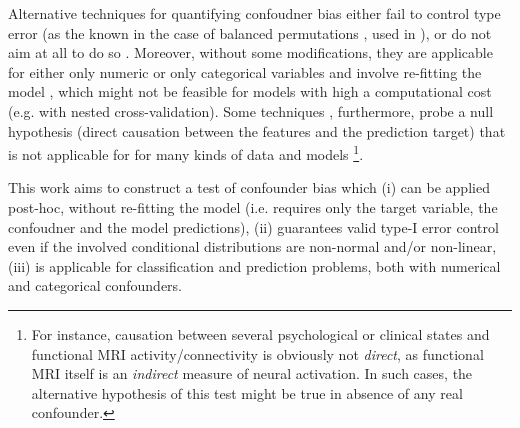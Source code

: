 \documentclass{article}
\begin{document}
Alternative techniques for quantifying confoudner bias either fail to control type error (as  the known in the case of balanced permutations \cite{southworth2009properties, hemerik2018exact}, used in \cite{chaibub2019permutation}), or do not aim at all to do so \cite{ferrari2020measuring, wachinger2021detect}. 
Moreover, without some modifications, they are applicable for either only numeric \cite{wachinger2021detect} or only categorical variables \citep{chaibub2019permutation, ferrari2020measuring} and involve re-fitting the model \citep{chaibub2019permutation, ferrari2020measuring}, which might not be feasible for models with high a computational cost (e.g. with nested cross-validation). Some techniques \cite{wachinger2021detect}, furthermore, probe a null hypothesis (direct causation between the features and the prediction target) that is not applicable for for many kinds of data and models \footnote{For instance, causation between several psychological or clinical states and functional MRI activity/connectivity is obviously not \emph{direct}, as functional MRI itself is an \emph{indirect} measure of neural activation. In such cases, the alternative hypothesis of this test might be true in absence of any real confounder. }.

This work aims to construct a test of confounder bias which (i) can be applied post-hoc, without re-fitting the model (i.e. requires only the target variable, the confoudner and the model predictions), (ii) guarantees valid type-I error control even if the involved conditional distributions are non-normal and/or non-linear, (iii) is applicable for classification and prediction problems, both with numerical and categorical confounders.


\end{document}
